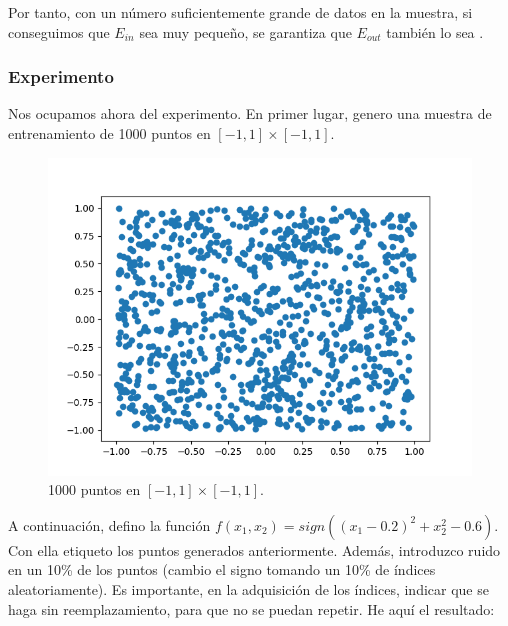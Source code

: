 Por tanto, con un número suficientemente grande de datos en la muestra, si conseguimos que $E_{in}$ sea muy pequeño, se garantiza que $E_{out}$ también lo sea \cite{esl}.

\newpage

\subsubsection{Experimento}

Nos ocupamos ahora del experimento. En primer lugar, genero una muestra de entrenamiento de 1000 puntos en $[-1,1]\times[-1,1]$.
\begin{figure}[H] %
	\centering
	\includegraphics[scale=0.8]{puntos.png}  %
	\caption{1000 puntos en $[-1,1]\times[-1,1]$.} 
	\label{fig:puntos2D}
\end{figure}

A continuación, defino la función $f(x_1,x_2) = sign((x_1-0.2)^2+x_2^2-0.6)$. Con ella etiqueto los puntos generados anteriormente. Además, introduzco ruido en un 10\% de los puntos (cambio el signo tomando un 10\% de índices aleatoriamente). Es importante, en la adquisición de los índices, indicar que se haga sin reemplazamiento, para que no se puedan repetir. He aquí el resultado:

